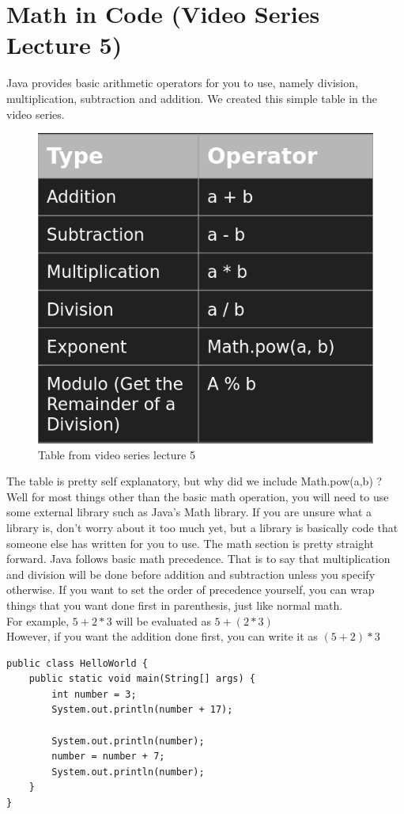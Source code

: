 \documentclass[11]{article}
\begin{document}
\section{Math in Code (Video Series Lecture 5)}
Java provides basic arithmetic operators for you to use, namely division, multiplication, subtraction and addition. We created this simple table in the video series.
\begin{figure}[H]
	\centering
	\includegraphics[scale=0.5]{math1.png}
	\caption{Table from video series lecture 5}
\end{figure}

The table is pretty self explanatory, but why did we include Math.pow(a,b) ? Well for most things other than the basic math operation, you will need to use some external library such as Java's Math library. If you are unsure what a library is, don't worry about it too much yet, but a library is basically code that someone else has written for you to use. The math section is pretty straight forward. Java follows basic math precedence. That is to say that multiplication and division will be done before addition and subtraction unless you specify otherwise. If you want to set the order of precedence yourself, you can wrap things that you want done first in parenthesis, just like normal math.\\

For example, $5 + 2 * 3$ will be evaluated as $5 + (2 * 3)$ \\
However, if you want the addition done first, you can write it as $(5 + 2) * 3$\\
\pagebreak
\begin{lstlisting}
public class HelloWorld {
    public static void main(String[] args) {
        int number = 3;
        System.out.println(number + 17);

        System.out.println(number);
        number = number + 7;
        System.out.println(number);
    }
}

\end{lstlisting}
\end{document}
